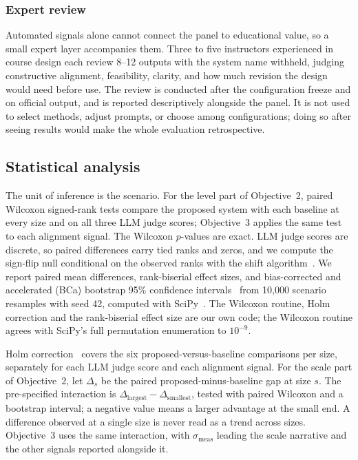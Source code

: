 \subsubsection{Expert review}
\label{sec:expert}

Automated signals alone cannot connect the panel to educational value, so a small
expert layer accompanies them. Three to five instructors experienced in course
design each review 8--12 outputs with the system name withheld, judging
constructive alignment, feasibility, clarity, and how much revision the design would
need before use. The review is conducted after the configuration freeze and on
official output, and is reported descriptively alongside the panel. It is not used
to select methods, adjust prompts, or choose among configurations; doing so after
seeing results would make the whole evaluation retrospective.

\subsection{Statistical analysis}
\label{sec:stats}

The unit of inference is the scenario. For the level part of Objective~2, paired
Wilcoxon signed-rank tests compare the proposed system with each baseline at every
size and on all three LLM judge scores; Objective~3 applies the same test to each
alignment signal. The Wilcoxon $p$-values are exact. LLM judge scores are discrete,
so paired differences carry tied ranks and zeros, and we compute the sign-flip null
conditional on the observed ranks with the shift
algorithm~\cite{streitberg1986exact}. We report paired mean differences,
rank-biserial effect sizes, and bias-corrected and accelerated (BCa) bootstrap 95\%
confidence intervals~\cite{efron1987better} from 10{,}000 scenario resamples with
seed 42, computed with SciPy~\cite{virtanen2020scipy}. The Wilcoxon routine, Holm
correction and the rank-biserial effect size are our own code; the Wilcoxon routine
agrees with SciPy's full permutation enumeration to $10^{-9}$.

Holm correction~\cite{holm1979simple} covers the six proposed-versus-baseline comparisons per size,
separately for each LLM judge score and each alignment signal. For the scale part of
Objective~2, let
$\Delta_s$ be the paired proposed-minus-baseline gap at size $s$. The pre-specified
interaction is $\Delta_{\mathrm{largest}}-\Delta_{\mathrm{smallest}}$, tested with
paired Wilcoxon and a bootstrap interval; a negative value means a larger advantage
at the small end. A difference observed at a single size is never read as a trend
across sizes. Objective~3 uses the same interaction, with $\sigma_{\mathrm{meas}}$
leading the scale narrative and the other signals reported alongside it.

